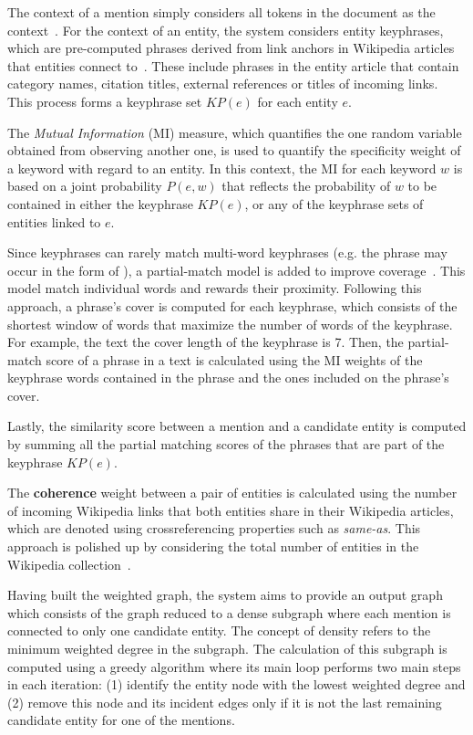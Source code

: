 The context of a mention simply considers all tokens in the document as the 
context~\cite{infExtr:ThaterFP10}. For the context of an entity, the system considers entity 
keyphrases, which are pre-computed phrases derived from link anchors in Wikipedia articles that 
entities connect to~\cite{infExtr:ThaterFP10}. These include phrases in the entity article that 
contain category names, citation titles, external references or titles of incoming links. This 
process forms a keyphrase set $KP(e)$ for each entity $e$. 

The \textit{Mutual Information} (MI) measure, which quantifies the  
one random variable obtained from observing another one, is used to quantify the specificity weight 
of a keyword with regard to an entity. In this context, the MI for each keyword $w$ is based on 
a joint probability $P(e, w)$ that reflects the probability of $w$ to be contained in either the 
keyphrase $KP(e)$, or any of the keyphrase sets of entities linked to $e$. 

Since keyphrases can rarely match multi-word keyphrases (e.g. the phrase  may occur in the form of ), a partial-match model is added to 
improve coverage~\cite{infExtr:taneva2011}. This model match individual words and rewards their
proximity. Following this approach, a phrase's cover is computed for each keyphrase, which 
consists of the shortest window of words that maximize the number of words of the keyphrase. 
For example, the text  the cover length of the 
keyphrase  is 7. Then, the partial-match score of a phrase in a text 
is calculated using the MI weights of the keyphrase words contained in the phrase and the ones
included on the phrase's cover.

Lastly, the similarity score between a mention and a candidate entity is computed by summing all 
the partial matching scores of the phrases that are part of the keyphrase $KP(e)$.

The \textbf{coherence} weight between a pair of entities is calculated using the number of 
incoming Wikipedia links that both entities share in their Wikipedia articles, which are denoted 
using crossreferencing properties such as \textit{same-as}. This approach is polished up by 
considering the total number of entities in the Wikipedia collection~\cite{infExtr:MilneW08}.

Having built the weighted graph, the system aims to provide an output graph which consists of 
the graph reduced to a dense subgraph where each mention is connected to only one candidate 
entity. The concept of density refers to the minimum weighted degree in the subgraph. The 
calculation of this subgraph is computed using a greedy algorithm where its main loop performs 
two main steps in each iteration: (1) identify the entity node with the lowest weighted degree 
and (2) remove this node and its incident edges only if it is not the last remaining candidate 
entity for one of the mentions. 

